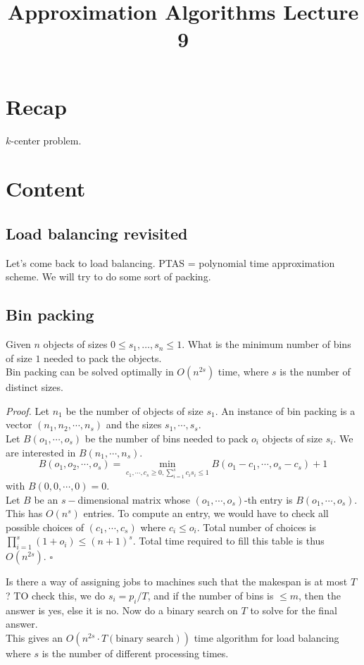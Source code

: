 \documentclass[a4paper]{article}
\title{\textbf{Approximation Algorithms Lecture 9}}
\date{}
\newenvironment{proof}{\begin{breakbox}\textit{Proof.}}{\hfill$\square$\end{breakbox}}
\newcommand{\nl}{\vspace{0.2cm}\\}
\begin{document}
\maketitle
\tableofcontents

\section{Recap}

$k$-center problem.

\section{Content}

\subsection{Load balancing revisited}

Let's come back to load balancing. PTAS = polynomial time approximation scheme. We will try to do some sort of packing.

\subsection{Bin packing}
Given $n$ objects of sizes $0 \le s_1, \ldots, s_n \le 1$. What is the minimum number of bins of size $1$ needed to pack the objects.\nl
Bin packing can be solved optimally in $O(n^{2s})$ time, where $s$
is the number of distinct sizes.\nl
\begin{proof}
    Let $n_1$ be the number of objects of size $s_1$. An instance of bin packing is a vector $(n_1, n_2, \cdots, n_s)$ and the sizes $s_1, \cdots, s_s$.\nl
    Let $B(o_1, \cdots, o_s)$ be the number of bins needed to pack $o_i$ objects of size $s_i$. We are interested in $B(n_1, \cdots, n_s)$.\nl
    $$B(o_1, o_2, \cdots, o_s) = \min_{c_1, \cdots, c_s \ge 0, \sum_{i=1}^s c_i s_i \le 1} B(o_1 - c_1, \cdots, o_s - c_s) + 1$$
    with $B(0, 0, \cdots, 0) = 0$.\nl
    Let $B$ be an $s-$dimensional matrix whose $(o_1, \cdots, o_s)$-th entry is $B(o_1, \cdots, o_s)$. This has $O(n^s)$ entries. To compute an entry, we would have to check all possible choices of
    $(c_1, \cdots, c_s)$ where $c_i \le o_i$. Total number of choices is $\prod_{i=1}^s (1 + o_i) \le (n + 1)^s$.
    Total time required to fill this table is thus $O(n^{2s})$.
\end{proof}

Is there a way of assigning jobs to machines such that the makespan is at most $T$? TO check this, we do $s_i = p_i / T$, and if the number of bins is $\le m$, then the answer is yes, else it
is no. Now do a binary search on $T$ to solve for the final answer.\nl
This gives an $O(n^{2s} \cdot T(\text{binary search}))$ time algorithm for load balancing where $s$ is the number of different processing times.\nl
\end{document}
